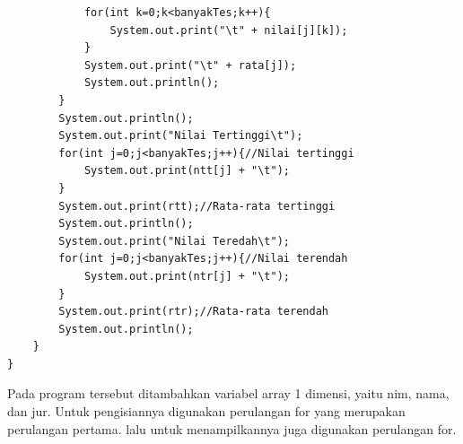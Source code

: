 \documentclass[a4paper,12pt]{article}
\begin{document}
\begin{lstlisting}
            for(int k=0;k<banyakTes;k++){
                System.out.print("\t" + nilai[j][k]);
            }
            System.out.print("\t" + rata[j]);
            System.out.println();
        }
        System.out.println();
        System.out.print("Nilai Tertinggi\t");
        for(int j=0;j<banyakTes;j++){//Nilai tertinggi
            System.out.print(ntt[j] + "\t");
        }
        System.out.print(rtt);//Rata-rata tertinggi
        System.out.println();
        System.out.print("Nilai Teredah\t");
        for(int j=0;j<banyakTes;j++){//Nilai terendah
            System.out.print(ntr[j] + "\t");
        }
        System.out.print(rtr);//Rata-rata terendah
        System.out.println();
    }
}
\end{lstlisting}
Pada program tersebut ditambahkan variabel array 1 dimensi, yaitu nim, nama, dan jur. Untuk pengisiannya digunakan perulangan for yang merupakan perulangan pertama.
lalu untuk menampilkannya juga digunakan perulangan for.
\end{document}
